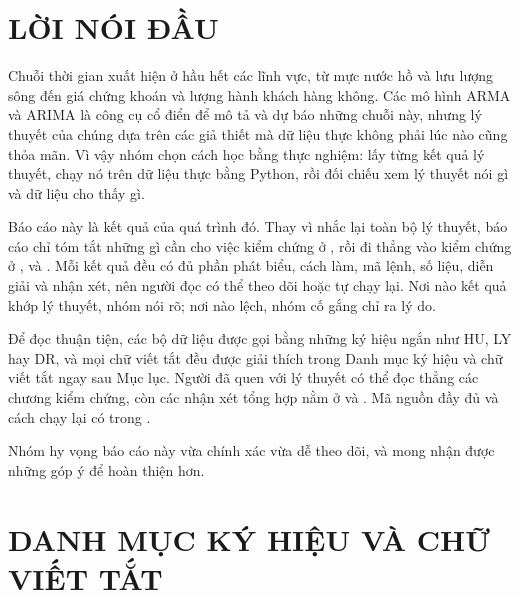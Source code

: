 \section*{LỜI NÓI ĐẦU}

Chuỗi thời gian xuất hiện ở hầu hết các lĩnh vực, từ mực nước hồ và lưu lượng sông đến giá chứng khoán và lượng hành khách hàng không. Các mô hình ARMA và ARIMA là công cụ cổ điển để mô tả và dự báo những chuỗi này, nhưng lý thuyết của chúng dựa trên các giả thiết mà dữ liệu thực không phải lúc nào cũng thỏa mãn. Vì vậy nhóm chọn cách học bằng thực nghiệm: lấy từng kết quả lý thuyết, chạy nó trên dữ liệu thực bằng Python, rồi đối chiếu xem lý thuyết nói gì và dữ liệu cho thấy gì.

Báo cáo này là kết quả của quá trình đó. Thay vì nhắc lại toàn bộ lý thuyết, báo cáo chỉ tóm tắt những gì cần cho việc kiểm chứng ở , rồi đi thẳng vào kiểm chứng ở ,  và . Mỗi kết quả đều có đủ phần phát biểu, cách làm, mã lệnh, số liệu, diễn giải và nhận xét, nên người đọc có thể theo dõi hoặc tự chạy lại. Nơi nào kết quả khớp lý thuyết, nhóm nói rõ; nơi nào lệch, nhóm cố gắng chỉ ra lý do.

Để đọc thuận tiện, các bộ dữ liệu được gọi bằng những ký hiệu ngắn như HU, LY hay DR, và mọi chữ viết tắt đều được giải thích trong Danh mục ký hiệu và chữ viết tắt ngay sau Mục lục. Người đã quen với lý thuyết có thể đọc thẳng các chương kiểm chứng, còn các nhận xét tổng hợp nằm ở  và . Mã nguồn đầy đủ và cách chạy lại có trong .

Nhóm hy vọng báo cáo này vừa chính xác vừa dễ theo dõi, và mong nhận được những góp ý để hoàn thiện hơn.
\clearpage

{\hypersetup{linkcolor=black}\tableofcontents\thispagestyle{fancy}}
\newpage

\clearpage
{}
\section*{DANH MỤC KÝ HIỆU VÀ CHỮ VIẾT TẮT}

